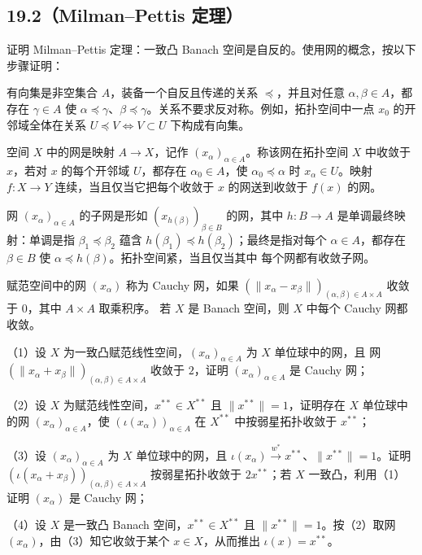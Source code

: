 \subsection*{19.2（Milman--Pettis 定理）}
\begin{problem}
证明 Milman--Pettis 定理：一致凸 Banach 空间是自反的。使用网的概念，按以下步骤证明：

有向集是非空集合 $A$，装备一个自反且传递的关系 $\preceq$，并且对任意
$\alpha,\beta\in A$，都存在 $\gamma\in A$ 使
$\alpha\preceq\gamma$、$\beta\preceq\gamma$。关系不要求反对称。例如，拓扑空间中一点
$x_0$ 的开邻域全体在关系 $U\preceq V\Longleftrightarrow V\subset U$ 下构成有向集。

空间 $X$ 中的网是映射 $A\to X$，记作 $(x_\alpha)_{\alpha\in A}$。称该网在拓扑空间
$X$ 中收敛于 $x$，若对 $x$ 的每个开邻域 $U$，都存在 $\alpha_0\in A$，使
$\alpha_0\preceq\alpha$ 时 $x_\alpha\in U$。映射 $f:X\to Y$ 连续，当且仅当它把每个收敛于
$x$ 的网送到收敛于 $f(x)$ 的网。

网 $(x_\alpha)_{\alpha\in A}$ 的子网是形如
$(x_{h(\beta)})_{\beta\in B}$ 的网，其中 $h:B\to A$ 是单调最终映射：单调是指
$\beta_1\preceq\beta_2$ 蕴含 $h(\beta_1)\preceq h(\beta_2)$；最终是指对每个
$\alpha\in A$，都存在 $\beta\in B$ 使 $\alpha\preceq h(\beta)$。拓扑空间紧，当且仅当其中
每个网都有收敛子网。

赋范空间中的网 $(x_\alpha)$ 称为 Cauchy 网，如果
$(\|x_\alpha-x_\beta\|)_{(\alpha,\beta)\in A\times A}$ 收敛于 $0$，其中 $A\times A$ 取乘积序。
若 $X$ 是 Banach 空间，则 $X$ 中每个 Cauchy 网都收敛。

（1）设 $X$ 为一致凸赋范线性空间，$(x_\alpha)_{\alpha\in A}$ 为 $X$ 单位球中的网，且
网 $(\|x_\alpha+x_\beta\|)_{(\alpha,\beta)\in A\times A}$ 收敛于 $2$，证明
$(x_\alpha)_{\alpha\in A}$ 是 Cauchy 网；

（2）设 $X$ 为赋范线性空间，$x^{**}\in X^{**}$ 且 $\|x^{**}\|=1$，证明存在 $X$ 单位球中的网
$(x_\alpha)_{\alpha\in A}$，使 $(\iota(x_\alpha))_{\alpha\in A}$ 在 $X^{**}$ 中按弱星拓扑收敛于
$x^{**}$；

（3）设 $(x_\alpha)_{\alpha\in A}$ 为 $X$ 单位球中的网，且
$\iota(x_\alpha)\overset{w^*}{\longrightarrow}x^{**}$、$\|x^{**}\|=1$。证明
$(\iota(x_\alpha+x_\beta))_{(\alpha,\beta)\in A\times A}$ 按弱星拓扑收敛于 $2x^{**}$；若
$X$ 一致凸，利用（1）证明 $(x_\alpha)$ 是 Cauchy 网；

（4）设 $X$ 是一致凸 Banach 空间，$x^{**}\in X^{**}$ 且 $\|x^{**}\|=1$。按（2）取网
$(x_\alpha)$，由（3）知它收敛于某个 $x\in X$，从而推出 $\iota(x)=x^{**}$。
\end{problem}

